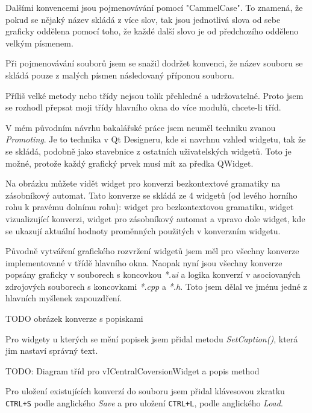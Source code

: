 Dalšími konvencemi jsou pojmenovávání pomocí "CammelCase". To znamená, že pokud se nějaký název skládá z více slov, tak jsou jednotlivá slova od sebe graficky oddělena pomocí toho, že každé další slovo je od předchozího odděleno velkým písmenem.

Při pojmenovávání souborů jsem se snažil dodržet konvenci, že název souboru se skládá pouze z malých písmen následovaný příponou souboru.


Příliš velké metody nebo třídy nejsou tolik přehledné a udržovatelné. Proto jsem se rozhodl přepsat moji třídy hlavního okna do více modulů, chcete-li tříd.

V mém původním návrhu bakalářské práce jsem neuměl techniku zvanou \textit{Promoting}. Je to technika v Qt Designeru, kde si navrhnu vzhled widgetu, tak že se skládá, podobně jako stavebnice z ostatních uživatelských widgetů. Toto je možné, protože každý grafický prvek musí mít za předka QWidget.


Na obrázku můžete vidět widget pro konverzi bezkontextové gramatiky na zásobníkový automat. Tato konverze se skládá ze 4 widgetů (od levého horního rohu k pravému dolnímu rohu): widget pro bezkontextovou gramatiku, widget vizualizující konverzi, widget pro zásobníkový automat a vpravo dole widget, kde se ukazují aktuální hodnoty proměnných použitých v konverzním widgetu.

Původně vytváření grafického rozvržení widgetů jsem měl pro všechny konverze implementované v třídě hlavního okna. Naopak nyní jsou všechny konverze popsány graficky v souborech s koncovkou \textit{*.ui} a logika konverzí v asociovaných zdrojových souborech s koncovkami \textit{*.cpp} a \textit{*.h}. Toto jsem dělal ve jménu jedné z hlavních myšlenek zapouzdření.

TODO obrázek konverze s popiskami

Pro widgety u kterých se mění popisek jsem přidal metodu \textit{SetCaption()}, která jim nastaví správný text.

TODO: Diagram tříd pro vICentralCoversionWidget a popis method 


Pro uložení existujících konverzí do souboru jsem přidal klávesovou zkratku \texttt{CTRL+S} podle anglického \textit{Save} a pro uložení \texttt{CTRL+L}, podle anglického \textit{Load}.

